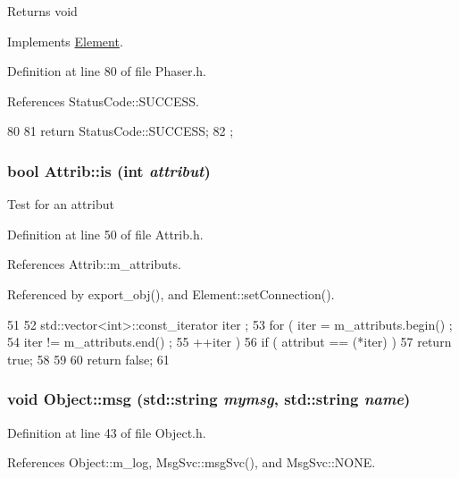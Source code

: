 \begin{DoxyReturn}{Returns}
void 
\end{DoxyReturn}


Implements \hyperlink{classElement_af42754b5cabc198869222725218d695c}{Element}.

Definition at line 80 of file Phaser.h.

References StatusCode::SUCCESS.


\begin{DoxyCode}
80                     {
81     return StatusCode::SUCCESS;
82   };
\end{DoxyCode}
\hypertarget{classAttrib_a704f26af560909ad22065083bb7d4c34}{
\subsubsection[{is}]{\setlength{\rightskip}{0pt plus 5cm}bool Attrib::is (int {\em attribut})}}
\label{classAttrib_a704f26af560909ad22065083bb7d4c34}
Test for an attribut 

Definition at line 50 of file Attrib.h.

References Attrib::m\_\-attributs.

Referenced by export\_\-obj(), and Element::setConnection().


\begin{DoxyCode}
51   {
52     std::vector<int>::const_iterator iter ;
53     for ( iter  = m_attributs.begin() ;
54           iter != m_attributs.end()   ;
55           ++iter ) {
56       if ( attribut == (*iter) ) {
57         return true;
58       }
59     }
60     return false;
61   }
\end{DoxyCode}
\hypertarget{classObject_ac5d59299273cee27aacf7de00d2e7034}{
\subsubsection[{msg}]{\setlength{\rightskip}{0pt plus 5cm}void Object::msg (std::string {\em mymsg}, \/  std::string {\em name})}}
\label{classObject_ac5d59299273cee27aacf7de00d2e7034}


Definition at line 43 of file Object.h.

References Object::m\_\-log, MsgSvc::msgSvc(), and MsgSvc::NONE.


